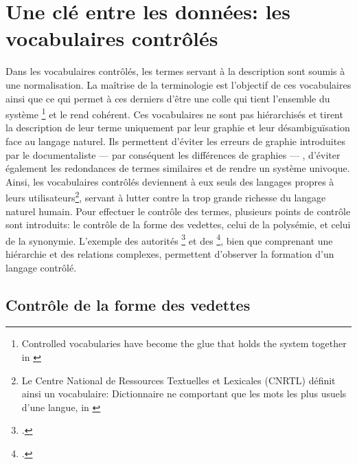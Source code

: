 \section{\label{I-A-2}Une clé entre les données: les vocabulaires contrôlés}

Dans les vocabulaires contrôlés, les termes servant à la description sont soumis à une normalisation. La maîtrise de la terminologie est l'objectif de ces vocabulaires ainsi que ce qui permet à ces derniers d'être une \og colle qui tient l'ensemble du système \footnote{\og Controlled vocabularies have become the glue that holds the system together \fg{} in \cite{rosenfeld_information_2015}}\fg{} et le rend cohérent. Ces vocabulaires ne sont pas hiérarchisés et tirent la description de leur terme uniquement par leur graphie et leur désambiguïsation face au langage naturel. Ils permettent d'éviter les erreurs de graphie introduites par le documentaliste --- par conséquent les différences de graphies --- , d'éviter également les redondances de termes similaires et de rendre un système univoque.
Ainsi, les vocabulaires contrôlés deviennent à eux seuls des langages propres à leurs utilisateurs\footnote{Le Centre National de Ressources Textuelles et Lexicales (CNRTL) définit ainsi un vocabulaire: \og Dictionnaire ne comportant que les mots les plus usuels d'une langue\fg{}, in \cite{cnrtl_definition_2020}}, servant à lutter contre la trop grande richesse du langage naturel humain.
Pour effectuer le contrôle des termes, plusieurs points de contrôle sont introduits: le contrôle de la forme des vedettes, celui de la polysémie, et celui de la synonymie. L'exemple des autorités \footcite{bibliotheque_nationale_de_france_rameau_nodate} et des \footcite{the_library_of_congress_library_nodate}, bien que comprenant une hiérarchie et des relations complexes, permettent d'observer la formation d'un langage contrôlé.

\subsection{\label{I-A-2-a}Contrôle de la forme des vedettes}

